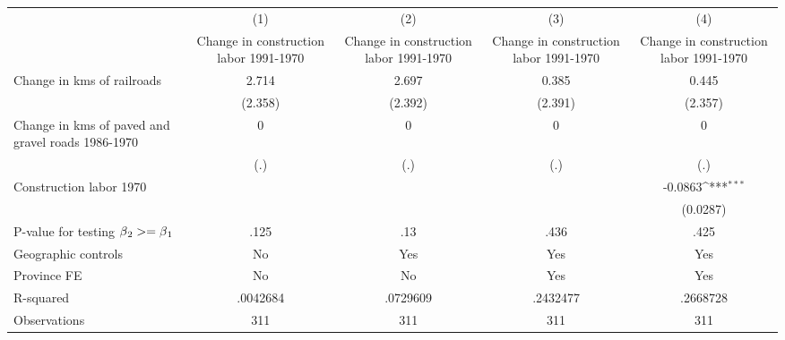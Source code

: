 {
\def\sym#1{\ifmmode^{#1}\else\(^{#1}\)\fi}
\begin{tabular}{l*{4}{c}}
\hline\hline
                &\multicolumn{1}{c}{(1)}&\multicolumn{1}{c}{(2)}&\multicolumn{1}{c}{(3)}&\multicolumn{1}{c}{(4)}\\
                &\multicolumn{1}{c}{Change in construction labor 1991-1970}&\multicolumn{1}{c}{Change in construction labor 1991-1970}&\multicolumn{1}{c}{Change in construction labor 1991-1970}&\multicolumn{1}{c}{Change in construction labor 1991-1970}\\
\hline
Change in kms of railroads&    2.714         &    2.697         &    0.385         &    0.445         \\
                &  (2.358)         &  (2.392)         &  (2.391)         &  (2.357)         \\
[1em]
Change in kms of paved and gravel roads 1986-1970&        0         &        0         &        0         &        0         \\
                &      (.)         &      (.)         &      (.)         &      (.)         \\
[1em]
Construction labor 1970&                  &                  &                  &  -0.0863\sym{***}\\
                &                  &                  &                  & (0.0287)         \\
\hline
P-value for testing $\beta\\_2 >= \beta\\_1$&     .125         &      .13         &     .436         &     .425         \\
Geographic controls&       No         &      Yes         &      Yes         &      Yes         \\
Province FE     &       No         &       No         &      Yes         &      Yes         \\
R-squared       & .0042684         & .0729609         & .2432477         & .2668728         \\
Observations    &      311         &      311         &      311         &      311         \\
\hline\hline
\end{tabular}
}
